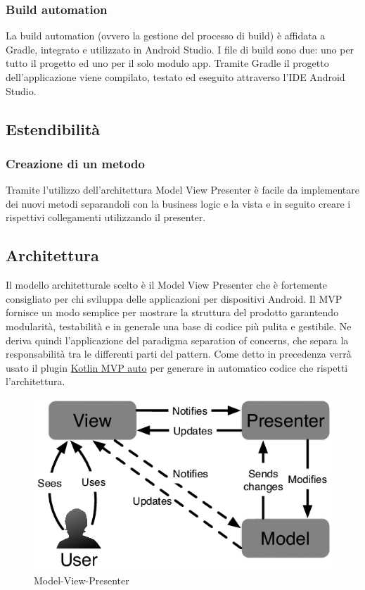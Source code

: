 \subsubsection{Build automation}
La build automation (ovvero la gestione del processo di build) è affidata a Gradle, integrato e utilizzato in Android Studio. I file di build sono due: uno per tutto il progetto ed uno per il solo modulo app.
Tramite Gradle il progetto dell'applicazione viene compilato, testato ed eseguito attraverso l'IDE Android Studio.


\subsection{Estendibilità}

\subsubsection{Creazione di un metodo}
Tramite l'utilizzo dell'architettura Model View Presenter è facile da implementare dei nuovi metodi separandoli con la business logic e la vista e in seguito creare i rispettivi collegamenti utilizzando il presenter.


\subsection{Architettura}
Il modello architetturale scelto è il Model View Presenter che è fortemente consigliato per chi sviluppa delle applicazioni per dispositivi Android. Il MVP fornisce un modo semplice per mostrare la struttura del prodotto garantendo modularità, testabilità e in generale una base di codice più pulita e gestibile. Ne deriva quindi l'applicazione del paradigma separation of concerns, che separa la responsabilità tra le differenti parti del pattern.
Come detto in precedenza verrà usato il plugin \href{https://git-scm.com/downloads}{Kotlin MVP auto} per generare in automatico codice che rispetti l'architettura.
\begin{figure}[H]
	\centering
	\includegraphics[width=16cm]{res/images/mvp.png}
	\caption{Model-View-Presenter}
	\label{fig:Model-View-Presenter}
\end{figure}

